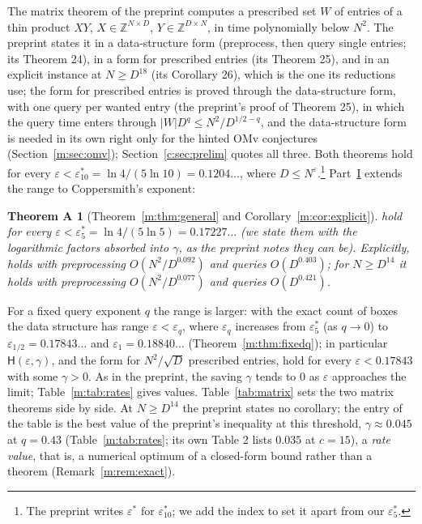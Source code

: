 \documentclass[11pt]{article}
\newtheorem*{theoremA}{Theorem A}
\theoremstyle{definition}
\theoremstyle{remark}
\newcommand{\Z}{\mathbb{Z}}
\newcommand{\es}{\varepsilon^*_5}
\newcommand{\et}{\varepsilon^*_{10}}
\newcommand{\Hyp}{\mathsf{H}}
\newcommand{\HintedOMvRfourteen}{0.18840}%
\newcommand{\HypHalfRfourteen}{0.17843}%
\begin{document}
The matrix theorem of the preprint computes a prescribed set $W$ of entries of a thin product $XY$, $X\in\Z^{N\times D}$, $Y\in\Z^{D\times N}$, in time polynomially below $N^2$. The preprint states it in a data-structure form (preprocess, then query single entries; its Theorem 24), in a form for prescribed entries (its Theorem 25), and in an explicit instance at $N\ge D^{18}$ (its Corollary 26), which is the one its reductions use; the form for prescribed entries is proved through the data-structure form, with one query per wanted entry (the preprint's proof of Theorem 25), in which the query time enters through $|W|D^{q}\le N^2/D^{1/2-q}$, and the data-structure form is needed in its own right only for the hinted OMv conjectures (Section~\ref{m:sec:omv}); Section~\ref{c:sec:prelim} quotes all three. Both theorems hold for every $\varepsilon<\et=\ln4/(5\ln10)=0.1204\ldots$, where $D\le N^\varepsilon$.\footnote{The preprint writes $\varepsilon^*$ for $\et$; we add the index to set it apart from our $\es$.} Part~\hyperref[m:partI]{I} extends the range to Coppersmith's exponent:
\label{m:introA}\begin{theoremA}[Theorem~\ref{m:thm:general} and Corollary~\ref{m:cor:explicit}]
\cite[Theorems 24 and 25]{ZT} hold for every $\varepsilon<\es=\ln4/(5\ln5)=0.17227\ldots$ (we state them with the logarithmic factors absorbed into $\gamma$, as the preprint notes they can be). Explicitly, \cite[Corollary 26]{ZT} holds with preprocessing $O(N^2/D^{0.092})$ and queries $O(D^{0.403})$; for $N\ge D^{14}$ it holds with preprocessing $O(N^2/D^{0.077})$ and queries $O(D^{0.421})$.
\end{theoremA}
For a fixed query exponent $q$ the range is larger: with the exact count of boxes the data structure has range $\varepsilon<\varepsilon_q$, where $\varepsilon_q$ increases from $\es$ (as $q\to0$) to $\varepsilon_{1/2}=\HypHalfRfourteen\ldots$ and $\varepsilon_1=\HintedOMvRfourteen\ldots$ (Theorem~\ref{m:thm:fixedq}); in particular $\Hyp(\varepsilon,\gamma)$, and the form for $N^2/\sqrt D$ prescribed entries, hold for every $\varepsilon<\HypHalfRfourteen$ with some $\gamma>0$.
As in the preprint, the saving $\gamma$ tends to $0$ as $\varepsilon$ approaches the limit; Table~\ref{m:tab:rates} gives values. Table~\ref{tab:matrix} sets the two matrix theorems side by side. At $N\ge D^{14}$ the preprint states no corollary; the entry of the table is the best value of the preprint's inequality at this threshold, $\gamma\approx0.045$ at $q=0.43$ (Table~\ref{m:tab:rates}; its own Table 2 lists $0.035$ at $c=15$), a \emph{rate value}, that is, a numerical optimum of a closed-form bound rather than a theorem (Remark~\ref{m:rem:exact}).
\end{document}

